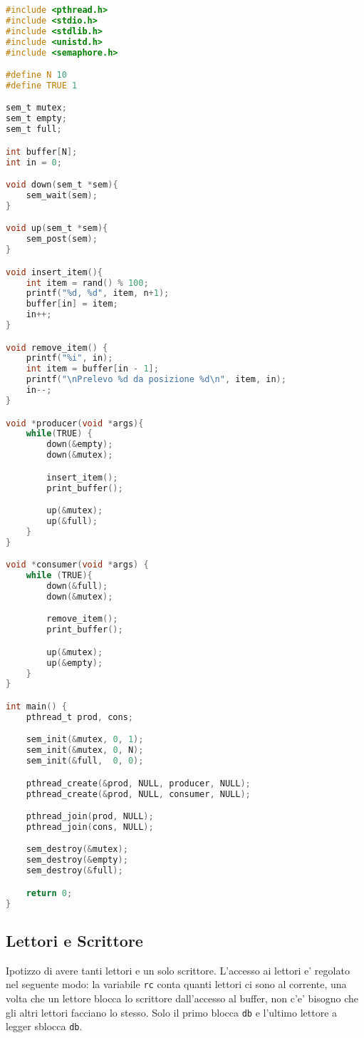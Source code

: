 \begin{lstlisting}[language=c]
#include <pthread.h> 
#include <stdio.h> 
#include <stdlib.h>
#include <unistd.h>
#include <semaphore.h>

#define N 10
#define TRUE 1

sem_t mutex;
sem_t empty;
sem_t full;

int buffer[N];
int in = 0;

void down(sem_t *sem){
    sem_wait(sem);
}

void up(sem_t *sem){
    sem_post(sem);
}

void insert_item(){
    int item = rand() % 100;
    printf("%d, %d", item, n+1);
    buffer[in] = item;
    in++;
}

void remove_item() {
    printf("%i", in);
    int item = buffer[in - 1];
    printf("\nPrelevo %d da posizione %d\n", item, in);
    in--;
}

void *producer(void *args){
    while(TRUE) {
        down(&empty);
        down(&mutex);

        insert_item();
        print_buffer();

        up(&mutex);
        up(&full);
    }
}

void *consumer(void *args) {
    while (TRUE){
        down(&full);
        down(&mutex);

        remove_item();
        print_buffer();

        up(&mutex);
        up(&empty);
    }
}

int main() {
    pthread_t prod, cons;

    sem_init(&mutex, 0, 1);
    sem_init(&mutex, 0, N);
    sem_init(&full,  0, 0);

    pthread_create(&prod, NULL, producer, NULL);
    pthread_create(&prod, NULL, consumer, NULL);

    pthread_join(prod, NULL);
    pthread_join(cons, NULL);

    sem_destroy(&mutex);
    sem_destroy(&empty);
    sem_destroy(&full);

    return 0;
}
\end{lstlisting}

\subsection{Lettori e Scrittore}
Ipotizzo di avere tanti lettori e un solo scrittore. L'accesso ai lettori e' regolato nel seguente modo:
la variabile \texttt{rc} conta quanti lettori ci sono al corrente, una volta che un lettore blocca lo scrittore 
dall'accesso al buffer, non c'e' bisogno che gli altri lettori facciano lo stesso. Solo il primo blocca \texttt{db}
e l'ultimo lettore a legger sblocca \texttt{db}.

